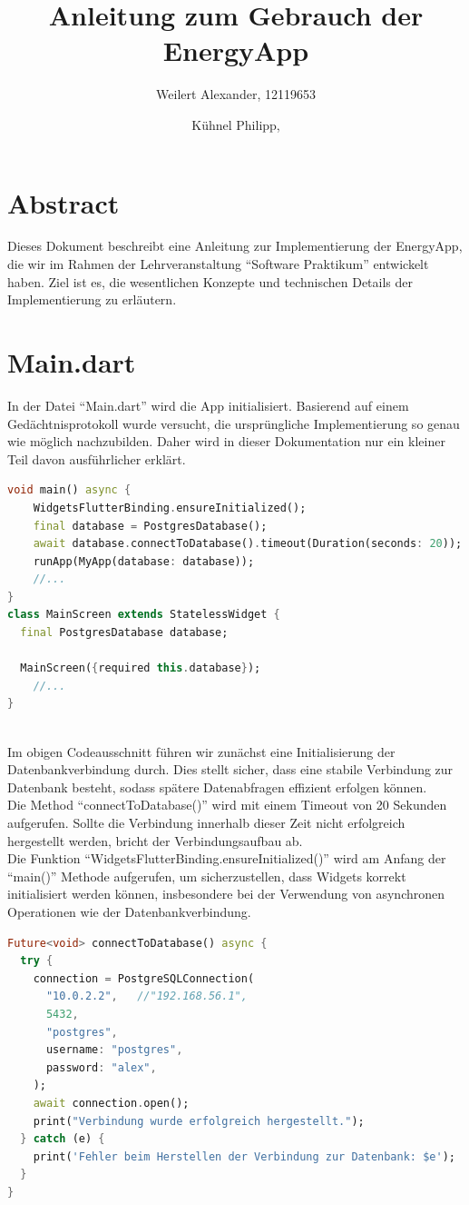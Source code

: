 \documentclass{article}
\title{Anleitung zum Gebrauch der EnergyApp}
\author{
    Weilert Alexander, 12119653
    \and
    Kühnel Philipp,
}
\begin{document}
    \section{Abstract}
    Dieses Dokument beschreibt eine Anleitung zur Implementierung der EnergyApp, die wir im Rahmen der
    Lehrveranstaltung \enquote{Software Praktikum} entwickelt haben.
    Ziel ist es, die wesentlichen Konzepte und technischen Details der Implementierung zu erläutern.

    \section{Main.dart}
    In der Datei \enquote{Main.dart} wird die App initialisiert.
    Basierend auf einem Gedächtnisprotokoll wurde versucht, die ursprüngliche Implementierung so genau wie möglich nachzubilden.
    Daher wird in dieser Dokumentation nur ein kleiner Teil davon ausführlicher erklärt.
\begin{lstlisting}[language=Dart]
void main() async {
    WidgetsFlutterBinding.ensureInitialized();
    final database = PostgresDatabase();
    await database.connectToDatabase().timeout(Duration(seconds: 20));
    runApp(MyApp(database: database));
    //...
}
class MainScreen extends StatelessWidget {
  final PostgresDatabase database;

  MainScreen({required this.database});
    //...
}
\end{lstlisting}
    \\
    Im obigen Codeausschnitt führen wir zunächst eine Initialisierung der Datenbankverbindung durch.
    Dies stellt sicher, dass eine stabile Verbindung zur Datenbank besteht, sodass spätere
    Datenabfragen effizient erfolgen können. \\
    Die Method \enquote{connectToDatabase()} wird mit einem Timeout von 20 Sekunden aufgerufen.
    Sollte die Verbindung innerhalb dieser Zeit nicht erfolgreich hergestellt werden,
    bricht der Verbindungsaufbau ab. \\
    Die Funktion \enquote{WidgetsFlutterBinding.ensureInitialized()} wird am Anfang der \enquote{main()} Methode
    aufgerufen, um sicherzustellen, dass Widgets korrekt initialisiert werden können, insbesondere bei der
    Verwendung von asynchronen Operationen wie der Datenbankverbindung.
    \begin{lstlisting}[language=Dart]
Future<void> connectToDatabase() async {
  try {
    connection = PostgreSQLConnection(
      "10.0.2.2",   //"192.168.56.1",
      5432,
      "postgres",
      username: "postgres",
      password: "alex",
    );
    await connection.open();
    print("Verbindung wurde erfolgreich hergestellt.");
  } catch (e) {
    print('Fehler beim Herstellen der Verbindung zur Datenbank: $e');
  }
}
    \end{lstlisting}
\end{document}
